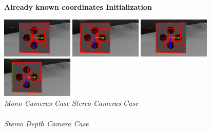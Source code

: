 \begin{figure}[H]
	\begin{center}
		\textbf{Already known coordinates Initialization}
	\end{center}
	\vspace{-10px}	
   	\includegraphics[width=3.4cm]{tracking/click/mono_left.png}
	\includegraphics[width=3.4cm]{tracking/click/mono_right.png}
	\hspace{10px}
	\includegraphics[width=3.4cm]{tracking/click/stereo_left.png}
	\includegraphics[width=3.4cm]{tracking/click/stereo_right.png}\\
	{\footnotesize \hspace*{20px}\textit{Mono Cameras Case} \hspace{120px} \textit{Stereo Cameras Case}}\\
	\\
    {\footnotesize \textit{Stereo Depth Camera Case}}\\  
\end{figure}
